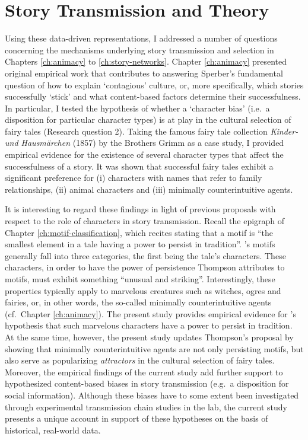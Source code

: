 \section{Story Transmission and Theory}

Using these data-driven representations, I addressed a number of questions concerning the mechanisms underlying story transmission and selection in Chapters \ref{ch:animacy} to \ref{ch:story-networks}. Chapter \ref{ch:animacy} presented original empirical work that contributes to answering Sperber's fundamental question of how to explain `contagious' culture\autocite{sperber:1996}, or, more specifically, which stories successfully `stick' and what content-based factors determine their successfulness. In particular, I tested the hypothesis of whether a `character bias' (i.e.\ a disposition for particular character types) is at play in the cultural selection of fairy tales (Research question 2). Taking the famous fairy tale collection \emph{Kinder- und Hausmärchen} (1857) by the Brothers Grimm as a case study, I provided empirical evidence for the existence of several character types that affect the successfulness of a story. It was shown that successful fairy tales exhibit a significant preference for (i) characters with names that refer to family relationships, (ii) animal characters and (iii) minimally counterintuitive agents. 

It is interesting to regard these findings in light of previous proposals with respect to the role of characters in story transmission. Recall the epigraph of Chapter \ref{ch:motif-classification}, which recites \citeauthor{thompson:1977} stating that a motif is ``the smallest element in a tale having a power to persist in tradition''.\autocite[415]{thompson:1977} \citeauthor{thompson:1955}'s motifs generally fall into three categories, the first being the tale's characters. These characters, in order to have the power of persistence Thompson attributes to motifs, must exhibit something ``unusual and striking''\autocite[415]{thompson:1977}. Interestingly, these properties typically apply to marvelous creatures such as witches, ogres and fairies, or, in other words, the so-called minimally counterintuitive agents (cf.\ Chapter \ref{ch:animacy}). The present study provides empirical evidence for \citeauthor{thompson:1977}'s hypothesis that such marvelous characters have a power to persist in tradition. At the same time, however, the present study updates Thompson's proposal by showing that minimally counterintuitive agents are not only persisting motifs, but also serve as popularizing \emph{attractors} in the cultural selection of fairy tales. Moreover, the empirical findings of the current study add further support to hypothesized content-based biases in story transmission (e.g.\ a disposition for social information\autocite{reysen:2011,Stubbersfield:2014}). Although these biases have to some extent been investigated through experimental transmission chain studies in the lab\autocite[See, for instance,][]{mesoudi:2006,barrett:2004,Upal:2007,HarmonVukic:2009,Barrett:2009}, the current study presents a unique account in support of these hypotheses on the basis of historical, real-world data. 


